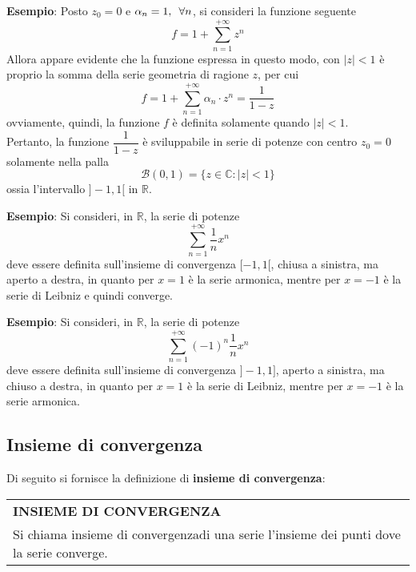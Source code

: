 \documentclass[a4paper]{extarticle}
\renewcommand\arraystretch{}
\begin{document}
\vspace{2em}
\noindent
\textbf{Esempio}: Posto $z_0=0$ e $\alpha_n=1, \hspace{0.5em} \forall n$, si consideri la funzione seguente
\[f=1+\sum_{n=1}^{+\infty} z^n\]
Allora appare evidente che la funzione espressa in questo modo, con $\vert z \vert < 1$ è proprio la somma della serie geometria di ragione $z$, per cui
\[f=1+\sum_{n=1}^{+\infty} \alpha_n \cdot z^n = \frac{1}{1-z}\]
ovviamente, quindi, la funzione $f$ è definita solamente quando $\vert z \vert < 1$.\\
Pertanto, la funzione $\dfrac{1}{1-z}$ è sviluppabile in serie di potenze con centro $z_0=0$ solamente nella palla
\[\mathcal{B}(0,1) = \{z \in \mathbb{C} : \vert z \vert < 1\}\]
ossia l'intervallo $]-1,1[$ in $\mathbb{R}$.

\vspace{1em}
\noindent
\textbf{Esempio}: Si consideri, in $\mathbb{R}$, la serie di potenze
\[\sum_{n=1}^{+\infty} \frac{1}{n} x^n\]
deve essere definita sull'insieme di convergenza $[-1,1[$, chiusa a sinistra, ma aperto a destra, in quanto per $x=1$ è la serie armonica, mentre per $x=-1$ è la serie di Leibniz e quindi converge.

\vspace{1em}
\noindent
\textbf{Esempio}: Si consideri, in $\mathbb{R}$, la serie di potenze
\[\sum_{n=1}^{+\infty} (-1)^n \frac{1}{n} x^n\]
deve essere definita sull'insieme di convergenza $]-1,1]$, aperto a sinistra, ma chiuso a destra, in quanto per $x=1$ è la serie di Leibniz, mentre per $x=-1$ è la serie armonica.

\vspace{1em}
\noindent
\subsection{Insieme di convergenza}
Di seguito si fornisce la definizione di \textbf{insieme di convergenza}:

\vspace{1em}
\setlength{\tabcolsep}{14pt}
\renewcommand{\arraystretch}{2}
\noindent
\begin{tabularx}{\textwidth}{@{}|P|@{}}
    \hline
    {\textbf{INSIEME DI CONVERGENZA}}\\
    \parbox{\linewidth}{Si chiama insieme di convergenzadi una serie l'insieme dei punti dove la serie converge.\vspace{3mm}}\\
    \hline
\end{tabularx}
\end{document}
